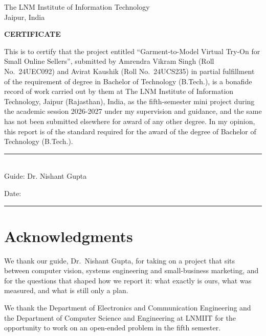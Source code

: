 \documentclass[12pt,a4paper,oneside]{report}
\newcommand{\markname}{}
\begin{document}
\pagestyle{plain}
\setcounter{page}{3}
\renewcommand{\markname}{}

\thispagestyle{empty}
\vspace*{22mm}
\begin{center}
{\Large The LNM Institute of Information Technology\\Jaipur, India\par}
\vspace{22mm}
{\Large\bfseries CERTIFICATE\par}
\end{center}
\vspace{10mm}
\noindent This is to certify that the project entitled ``Garment-to-Model Virtual Try-On for Small Online Sellers'', submitted by Amrendra Vikram Singh (Roll No.~24UEC092) and Avirat Kaushik (Roll No.~24UCS235) in partial fulfillment of the requirement of degree in Bachelor of Technology (B.Tech.), is a bonafide record of work carried out by them at The LNM Institute of Information Technology, Jaipur (Rajasthan), India, as the fifth-semester mini project during the academic session 2026-2027 under my supervision and guidance, and the same has not been submitted elsewhere for award of any other degree. In my opinion, this report is of the standard required for the award of the degree of Bachelor of Technology (B.Tech.).

\vspace{24mm}
\noindent\rule{62mm}{0.4pt}\\
Guide: Dr. Nishant Gupta

\vspace{12mm}
\noindent Date: \rule{38mm}{0.4pt}
\clearpage

\chapter*{Acknowledgments}
We thank our guide, Dr.\ Nishant Gupta, for taking on a project that sits between computer vision, systems engineering and small-business marketing, and for the questions that shaped how we report it: what exactly is ours, what was measured, and what is still only a plan.

We thank the Department of Electronics and Communication Engineering and the Department of Computer Science and Engineering at LNMIIT for the opportunity to work on an open-ended problem in the fifth semester.
\end{document}
